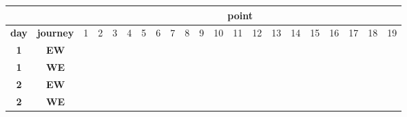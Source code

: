 
\centering

\begin{tabular}{cc*{19}{l|}}
\cline{3-21}
\multicolumn{1}{c}{} & \multicolumn{1}{c}{} & \multicolumn{19}{|c|}{\textbf{point}} \\
\hline
\multicolumn{1}{|l}{\textbf{day}} & \multicolumn{1}{|l|}{\textbf{journey}}   & 1                        & 2                        & 3                        & 4                        & 5                        & 6                        & 7                        & 8                        & 9                        & 10                       & 11                       & 12                       & 13                       & 14                       & 15                       & 16                       & 17                       & 18                       & 19                       \\ \hline
\multicolumn{1}{|c|}{\textbf{1}} & \textbf{EW} & \cellcolor[HTML]{F56B00} & \cellcolor[HTML]{F56B00} & \cellcolor[HTML]{5AB25A} & \cellcolor[HTML]{FFCB2F} & \cellcolor[HTML]{FFCB2F} & \cellcolor[HTML]{F56B00} & \cellcolor[HTML]{FFCB2F} & \cellcolor[HTML]{5AB25A} & \cellcolor[HTML]{F56B00} & \cellcolor[HTML]{5AB25A} & \cellcolor[HTML]{FFCB2F} & \cellcolor[HTML]{F56B00} & \cellcolor[HTML]{FFCB2F} & \cellcolor[HTML]{FFCB2F} & \cellcolor[HTML]{F56B00} & \cellcolor[HTML]{9A0000} & \cellcolor[HTML]{FFCB2F} & \cellcolor[HTML]{F56B00} & \cellcolor[HTML]{5AB25A} \\
\hline
\multicolumn{1}{|c|}{\textbf{1}} & \textbf{WE} & \cellcolor[HTML]{F56B00} & \cellcolor[HTML]{F56B00} &                          & \cellcolor[HTML]{FFCB2F} & \cellcolor[HTML]{FFCB2F} & \cellcolor[HTML]{FFCB2F} & \cellcolor[HTML]{FFCB2F} & \cellcolor[HTML]{FFCB2F} & \cellcolor[HTML]{F56B00} & \cellcolor[HTML]{F56B00} & \cellcolor[HTML]{FFCB2F} & \cellcolor[HTML]{F56B00} & \cellcolor[HTML]{FFCB2F} & \cellcolor[HTML]{FFCB2F} & \cellcolor[HTML]{9A0000} & \cellcolor[HTML]{9A0000} & \cellcolor[HTML]{FFCB2F} & \cellcolor[HTML]{F56B00} &  \\
 \hline
\multicolumn{1}{|c|}{\textbf{2}} & \textbf{EW} & \cellcolor[HTML]{F56B00} & \cellcolor[HTML]{F56B00} & \cellcolor[HTML]{5AB25A} & \cellcolor[HTML]{FFCB2F} & \cellcolor[HTML]{FFCB2F} & \cellcolor[HTML]{FFCB2F} & \cellcolor[HTML]{FFCB2F} & \cellcolor[HTML]{FFCB2F} & \cellcolor[HTML]{F56B00} & \cellcolor[HTML]{F56B00} & \cellcolor[HTML]{FFCB2F} & \cellcolor[HTML]{F56B00} & \cellcolor[HTML]{FFCB2F} & \cellcolor[HTML]{F56B00} & \cellcolor[HTML]{9A0000} & \cellcolor[HTML]{9A0000} & \cellcolor[HTML]{FFCB2F} & \cellcolor[HTML]{F56B00} & \cellcolor[HTML]{5AB25A} \\
\hline
\multicolumn{1}{|c|}{\textbf{2}} & \textbf{WE} & \cellcolor[HTML]{F56B00} & \cellcolor[HTML]{F56B00} & \cellcolor[HTML]{5AB25A} & \cellcolor[HTML]{FFCB2F} & \cellcolor[HTML]{FFCB2F} & \cellcolor[HTML]{FFCB2F} & \cellcolor[HTML]{FFCB2F} & \cellcolor[HTML]{FFCB2F} & \cellcolor[HTML]{F56B00} & \cellcolor[HTML]{FFCB2F} & \cellcolor[HTML]{FFCB2F} & \cellcolor[HTML]{FFCB2F} & \cellcolor[HTML]{FFCB2F} & \cellcolor[HTML]{FFCB2F} & \cellcolor[HTML]{9A0000} & \cellcolor[HTML]{9A0000} & \cellcolor[HTML]{FFCB2F} & \cellcolor[HTML]{9A0000} & \cellcolor[HTML]{5AB25A} \\ \hline
\end{tabular}

